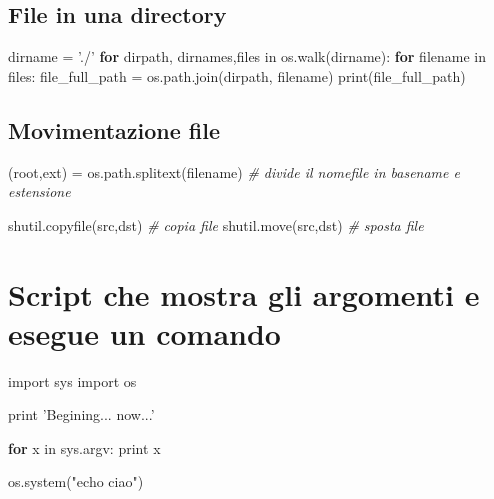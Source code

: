 \documentclass[]{article}
\newenvironment{Shaded}{}{}
\newcommand{\KeywordTok}[1]{\textcolor[rgb]{0.00,0.44,0.13}{\textbf{{#1}}}}
\newcommand{\DataTypeTok}[1]{\textcolor[rgb]{0.56,0.13,0.00}{{#1}}}
\newcommand{\CharTok}[1]{\textcolor[rgb]{0.25,0.44,0.63}{{#1}}}
\newcommand{\StringTok}[1]{\textcolor[rgb]{0.25,0.44,0.63}{{#1}}}
\newcommand{\CommentTok}[1]{\textcolor[rgb]{0.38,0.63,0.69}{\textit{{#1}}}}
\newcommand{\NormalTok}[1]{{#1}}
\begin{document}
\subsection{File in una directory}\label{file-in-una-directory}

\begin{Shaded}
\begin{Highlighting}[]
\NormalTok{dirname = }\StringTok{'./'}
\KeywordTok{for} \NormalTok{dirpath, dirnames,files in os.walk(dirname):}
    \KeywordTok{for} \NormalTok{filename in files:}
        \NormalTok{file_full_path = os.path.join(dirpath, filename)}
        \DataTypeTok{print}\NormalTok{(file_full_path)}
\end{Highlighting}
\end{Shaded}

\subsection{Movimentazione file}\label{movimentazione-file}

\begin{Shaded}
\begin{Highlighting}[]
\NormalTok{(root,ext) = os.path.splitext(filename) }\CommentTok{# divide il nomefile in basename e estensione}

\NormalTok{shutil.copyfile(src,dst) }\CommentTok{# copia file}
\NormalTok{shutil.move(src,dst) }\CommentTok{# sposta file}
\end{Highlighting}
\end{Shaded}

\section{Script che mostra gli argomenti e esegue un
comando}\label{script-che-mostra-gli-argomenti-e-esegue-un-comando}

\begin{Shaded}
\begin{Highlighting}[]
\CharTok{import} \NormalTok{sys}
\CharTok{import} \NormalTok{os}

\DataTypeTok{print} \StringTok{'Begining... now...'}

\KeywordTok{for} \NormalTok{x in sys.argv:}
    \DataTypeTok{print} \NormalTok{x}

\NormalTok{os.system(}\StringTok{"echo ciao"}\NormalTok{)}
\end{Highlighting}
\end{Shaded}
\end{document}
